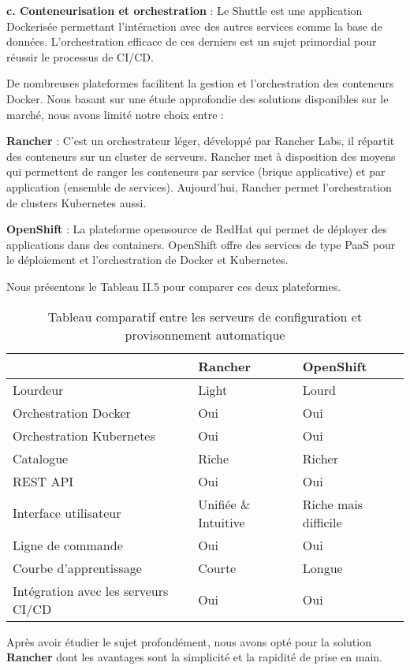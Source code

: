 \begin{spacing}{1.2}
\vspace{2mm}

\textbf{c. Conteneurisation et orchestration} : Le Shuttle est une application Dockerisée permettant l'intéraction avec des autres services comme la base de données. L'orchestration efficace de ces derniers est un sujet primordial pour réussir le processus de CI/CD. 

De nombreuses plateformes facilitent la gestion et l'orchestration des conteneurs Docker. Nous basant sur une étude approfondie des solutions disponibles sur le marché, nous avons limité notre choix entre : 

\textbf{Rancher} : C'est un orchestrateur léger, développé par Rancher Labs, il répartit des conteneurs sur un cluster de serveurs. Rancher met à disposition des moyens qui permettent de ranger les conteneurs par service (brique applicative) et par application (ensemble de services). Aujourd'hui, Rancher permet l'orchestration de clusters Kubernetes aussi. 

\textbf{OpenShift} : La plateforme opensource de RedHat qui permet de déployer des applications dans des containers. OpenShift offre des services de type PaaS pour le déploiement et l'orchestration de Docker et Kubernetes.

Nous présentons le Tableau II.5 pour comparer ces deux plateformes. 

\begin{table}[ht]
	\centering
	\caption{Tableau comparatif entre les serveurs de configuration et provisonnement automatique}
	\footnotesize
	\begin{tabularx}{\textwidth}{|X|X|X|}
          \hline & {\textbf{Rancher}} & {\textbf{OpenShift}} \\
          \hline
          Lourdeur  & Light & Lourd\\
          \hline
          Orchestration Docker & Oui & Oui \\
          \hline
          Orchestration Kubernetes & Oui & Oui \\ 
          \hline
          Catalogue & Riche & Richer \\
          \hline
          REST API & Oui & Oui \\
          \hline
          Interface utilisateur & Unifiée \& Intuitive & Riche mais difficile \\
          \hline
          Ligne de commande & Oui & Oui \\
          \hline
          Courbe d'apprentissage & Courte & Longue \\
          \hline
          Intégration avec les serveurs CI/CD & Oui & Oui \\
          \hline
        \end{tabularx}
	\label{tab:exple}
\end{table}
\FloatBarrier
Après avoir étudier le sujet profondément, nous avons opté pour la solution \textbf{Rancher} dont les avantages sont la simplicité et la rapidité de prise en main.


\end{spacing}
